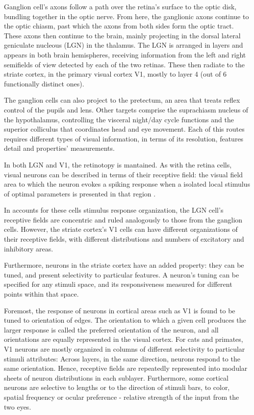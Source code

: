 Ganglion cell's axons follow a path over the retina's surface to the optic disk, bundling together in the optic nerve. %
From here, the ganglionic axons continue to the optic chiasm, past which the axons from both sides form the optic tract. These axons then continue to the brain, mainly projecting in the dorsal lateral geniculate nucleous (LGN) in the thalamus. The LGN is arranged in layers and appears in both brain hemispheres,  receiving information from the left and right semifields of view detected by each of the two retinas. These then radiate to the striate cortex, in the primary visual cortex V1, mostly to layer 4 (out of 6 functionally distinct ones).

The ganglion cells can also project to the pretectum, an area that treats reflex control of the pupils and lens. Other targets comprise the suprachiasm nucleus of the hypothalamus, controlling the visceral night/day cycle functions and the superior colliculus that coordinates head and eye movement. Each of this routes requires different types of visual information, in terms of its resolution, features detail and properties' measurements. 

In both LGN and V1, the retinotopy is mantained.
As with the retina cells, visual neurons can be described in terms of their receptive field: the visual field area to which the neuron evokes a spiking response when a isolated local stimulus of optimal parameters is presented in that region \cite{Hubel1959}.

In accounts for these cells stimulus response organization, the LGN cell's receptive fields are concentric and ruled analogously to those from the ganglion cells. 
However, the striate cortex's V1 cells can have different organizations of their receptive fields, with different distributions and numbers of excitatory and inhibitory areas. 

Furthermore, neurons in the striate cortex have an added property: they can be tuned, and present selectivity to particular features. A neuron's tuning can be specified for any stimuli space, and its responsiveness measured for different points within that space. 

Foremost, the response of neurons in cortical areas such as V1 is found to be tuned to orientation of edges. The orientation to which a given cell produces the larger response is called the preferred orientation of the neuron, and all orientations are equally represented in the visual cortex. For cats and primates, V1 neurons are mostly organized in columns of different selectivity to particular stimuli attributes: Across layers, in the same direction, neurons respond to the same orientation. Hence, receptive fields are repeatedly represented into modular sheets of neuron distributions in each sublayer. Furthermore, some cortical neurons are selective to lengths or to the direction of stimuli bars, to color, spatial frequency or ocular preference - relative strength of the input from the two eyes. 

